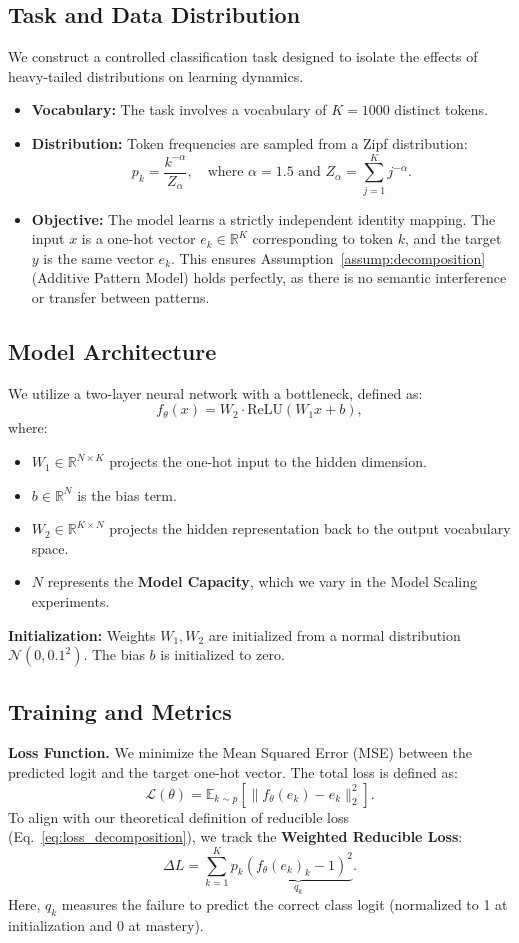 \documentclass{article}
\theoremstyle{plain}
\theoremstyle{definition}
\theoremstyle{remark}
\begin{document}
\subsection{Task and Data Distribution}
We construct a controlled classification task designed to isolate the effects of heavy-tailed distributions on learning dynamics.
\begin{itemize}
    \item \textbf{Vocabulary:} The task involves a vocabulary of $K=1000$ distinct tokens.
    \item \textbf{Distribution:} Token frequencies are sampled from a Zipf distribution:
    $$ p_k = \frac{k^{-\alpha}}{Z_\alpha}, \quad \text{where } \alpha = 1.5 \text{ and } Z_\alpha = \sum_{j=1}^{K} j^{-\alpha}. $$
    \item \textbf{Objective:} The model learns a strictly independent identity mapping. The input $x$ is a one-hot vector $e_k \in \mathbb{R}^K$ corresponding to token $k$, and the target $y$ is the same vector $e_k$. This ensures Assumption~\ref{assump:decomposition} (Additive Pattern Model) holds perfectly, as there is no semantic interference or transfer between patterns.
\end{itemize}

\subsection{Model Architecture}
We utilize a two-layer neural network with a bottleneck, defined as:
$$ f_\theta(x) = W_2 \cdot \text{ReLU}(W_1 x + b), $$
where:
\begin{itemize}
    \item $W_1 \in \mathbb{R}^{N \times K}$ projects the one-hot input to the hidden dimension.
    \item $b \in \mathbb{R}^N$ is the bias term.
    \item $W_2 \in \mathbb{R}^{K \times N}$ projects the hidden representation back to the output vocabulary space.
    \item $N$ represents the \textbf{Model Capacity}, which we vary in the Model Scaling experiments.
\end{itemize}
\textbf{Initialization:} Weights $W_1, W_2$ are initialized from a normal distribution $\mathcal{N}(0, 0.1^2)$. The bias $b$ is initialized to zero.

\subsection{Training and Metrics}
\textbf{Loss Function.} We minimize the Mean Squared Error (MSE) between the predicted logit and the target one-hot vector. The total loss is defined as:
$$ \mathcal{L}(\theta) = \mathbb{E}_{k \sim p} \left[ \| f_\theta(e_k) - e_k \|_2^2 \right]. $$
To align with our theoretical definition of reducible loss (Eq.~\ref{eq:loss_decomposition}), we track the \textbf{Weighted Reducible Loss}:
$$ \Delta L = \sum_{k=1}^{K} p_k \underbrace{(f_\theta(e_k)_k - 1)^2}_{q_k}. $$
Here, $q_k$ measures the failure to predict the correct class logit (normalized to 1 at initialization and 0 at mastery).
\end{document}
